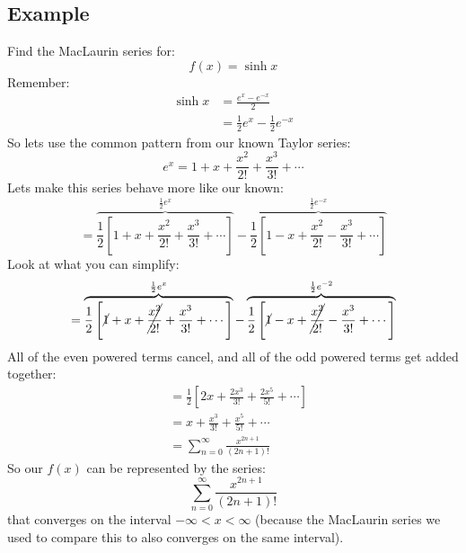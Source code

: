 \documentclass{report}
\begin{document}
    \subsection{Example}
        Find the MacLaurin series for:
        \[f(x) = \sinh x\]
        Remember:
        \begin{align*}
            \sinh x &= \frac{e^x - e^{-x}}{2} \\
            &= \frac{1}{2}e^x - \frac{1}{2}e^{-x}
        \end{align*}
        So lets use the common pattern from our known Taylor series:
        \[e^x = 1 + x + \frac{x^2}{2!} + \frac{x^3}{3!} + \cdots \]
        Lets make this series behave more like our known:
        \[= \overbrace{\frac{1}{2} \left[ 1 + x + \frac{x^2}{2!} + \frac{x^3}{3!} + \cdots \right]}^{\frac{1}{2}e^x} - \overbrace{\frac{1}{2} \left[ 1 - x + \frac{x^2}{2!} - \frac{x^3}{3!} + \cdots \right]}^{\frac{1}{2}e^{-x}}\]
        Look at what you can simplify:
        \[= \overbrace{\frac{1}{2} \left[ \cancel{1} + x + \cancel{\frac{x^2}{2!}} + \frac{x^3}{3!} + \cdots \right]}^{\frac{1}{2}e^x} - \overbrace{\frac{1}{2} \left[ \cancel{1} - x + \cancel{\frac{x^2}{2!}} - \frac{x^3}{3!} + \cdots \right]}^{\frac{1}{2}e^{-2}}\]
        All of the even powered terms cancel, and all of the odd powered terms get added together:
        \begin{align*}
            &= \frac{1}{2} \left[ 2x + \frac{2x^3}{3!} + \frac{2x^5}{5!} + \cdots \right] \\
            &= x + \frac{x^3}{3!} + \frac{x^5}{5!} + \cdots \\
            &= \sum_{n=0}^{\infty} \frac{x^{2n+1}}{(2n+1)!}
        \end{align*}
        So our \(f(x)\) can be represented by the series:
        \[\sum_{n=0}^{\infty} \frac{x^{2n+1}}{(2n+1)!}\]
        that converges on the interval \(- \infty < x < \infty\) (because the MacLaurin series we used to compare this to also converges on the same interval).
    
\end{document}
